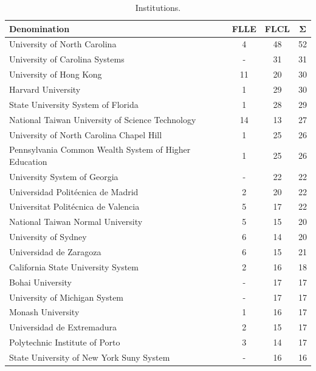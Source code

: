 \documentclass{textolivre-html}
\begin{document}
\begin{table}[htpb]
\caption{Institutions.}
\label{tbl-tabela-07}
\centering
\begin{tabular}{lccc}
\toprule
\textbf{Denomination} & \textbf{FLLE} & \textbf{FLCL} & \textbf{Σ} \\ 
\midrule
University of North Carolina                          & 4  & 48 & 52 \\ 
University of Carolina Systems                        & -  & 31 & 31 \\ 
University of Hong Kong                               & 11 & 20 & 30 \\ 
Harvard University                                    & 1  & 29 & 30 \\ 
State University System of Florida                    & 1  & 28 & 29 \\ 
National Taiwan University of Science Technology      & 14 & 13 & 27 \\ 
University of North Carolina Chapel Hill              & 1  & 25 & 26 \\ 
Pennsylvania Common Wealth System of Higher Education & 1  & 25 & 26 \\ 
University System of Georgia                          & -  & 22 & 22 \\ 
Universidad Politécnica de Madrid                     & 2  & 20 & 22 \\ 
Universitat Politécnica de Valencia                   & 5  & 17 & 22 \\ 
National Taiwan Normal University                     & 5  & 15 & 20 \\ 
University of Sydney                                  & 6  & 14 & 20 \\ 
Universidad de Zaragoza                               & 6  & 15 & 21 \\ 
California State University System                    & 2  & 16 & 18 \\ 
Bohai University                                      & -  & 17 & 17 \\ 
University of Michigan System                         & -  & 17 & 17 \\ 
Monash University                                     & 1  & 16 & 17 \\ 
Universidad de Extremadura                            & 2  & 15 & 17 \\ 
Polytechnic Institute of Porto                        & 3  & 14 & 17 \\ 
State University of New York Suny System              & -  & 16 & 16 \\ 

\end{tabular}
\end{table}
\end{document}
